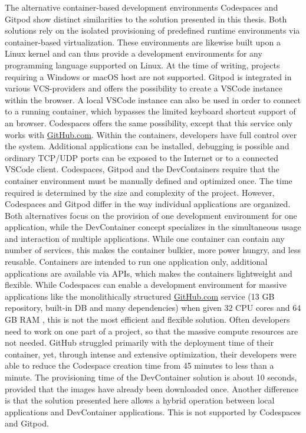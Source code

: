         The alternative container-based development environments Codespaces and Gitpod show distinct similarities to the solution presented in this thesis. Both solutions rely on the isolated provisioning of predefined runtime environments via container-based virtualization. These environments are likewise built upon a Linux kernel and can thus provide a development environments for any programming language supported on Linux. At the time of writing, projects requiring a Windows or macOS host are not supported.\newline
        Gitpod is integrated in various \ac{VCS}-providers and offers the possibility to create a \ac{VSCode} instance within the browser. A local \ac{VSCode} instance can also be used in order to connect to a running container, which bypasses the limited keyboard shortcut support of an browser. Codespaces offers the same possibility, except that this service only works with \href{https://www.GitHub.com}{GitHub.com}. Within the containers, developers have full control over the system. Additional applications can be installed, debugging is possible and ordinary TCP/UDP ports can be exposed to the Internet or to a connected \ac{VSCode} client. Codespaces, Gitpod and the DevContainers require that the container environment must be manually defined and optimized once. The time required is determined by the size and complexity of the project.\newline
        However, Codespaces and Gitpod differ in the way individual applications are organized. Both alternatives focus on the provision of one development environment for one application, while the DevContainer concept specializes in the simultaneous usage and interaction of multiple applications. While one container can contain any number of services, this makes the container bulkier, more power hungry, and less reusable. Containers are intended to run one application only, additional applications are available via \ac{API}s, which makes the containers lightweight and flexible. While Codespaces can enable a development environment for massive applications like the monolithically structured \href{https://www.GitHub.com}{GitHub.com} service (13 GB repository, built-in \ac{DB} and many dependencies) when given 32 CPU cores and 64 GB RAM \cite{githubblogcodespace}, this is not the most efficient and flexible solution. Often developers need to work on one part of a project, so that the massive compute resources are not needed. GitHub struggled primarily with the deployment time of their container, yet, through intense and extensive optimization, their developers were able to reduce the Codespace creation time from 45 minutes to less than a minute. The provisioning time of the DevContainer solution is about 10 seconds, provided that the images have already been downloaded once. Another difference is that the solution presented here allows a hybrid operation between local applications and DevContainer applications. This is not supported by Codespaces and Gitpod.
